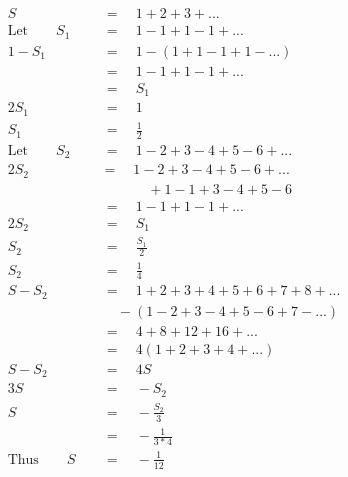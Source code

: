 \begin{align*}
S\quad&\,=\quad1+2+3+...\\
\mathrm{Let}\qquad S_1\quad&\,=\quad1-1+1-1+...\\
1-S_1\quad&\,=\quad1-(1+1-1+1-...)\\
\,&\,=\quad1-1+1-1+...\\
\,&\,=\quad S_1\\
2S_1\quad&\,=\quad1\\
S_1\quad&\,=\quad\frac{1}{2}\\
\mathrm{Let}\qquad S_2\quad&\,=\quad1-2+3-4+5-6+...\\
2S_2\quad&=\quad1-2+3-4+5-6+...\\
\quad&\,\qquad\quad\,+1-1+3-4+5-6\\
\,&\,=\quad1-1+1-1+...\\
2S_2\quad&\,=\quad S_1\\
S_2\quad&\,=\quad\frac{S_1}{2}\\
S_2\quad&\,=\quad\frac{1}{4}\\
S-S_2\quad&\,=\quad1+2+3+4+5+6+7+8+...\\
\quad&\,\quad-(1-2+3-4+5-6+7-...)\\
\,&\,=\quad4+8+12+16+...\\
\,&\,=\quad4(1+2+3+4+...)\\
S-S_2\quad&\,=\quad4S\\
3S\quad&\,=\quad-S_2\\
S\quad&\,=\quad-\frac{S_2}{3}\\
\,&\,=\quad-\frac{1}{3*4}\\
\mathrm{Thus}\qquad S\quad&\,=\quad-\frac{1}{12}
\end{align*}
